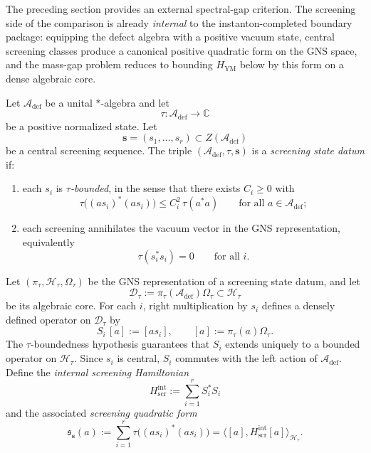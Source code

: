 The preceding section provides an external spectral-gap criterion.
The screening side of the comparison is already \emph{internal} to the
instanton-completed boundary package: equipping the defect algebra
with a positive vacuum state, central screening classes produce a
canonical positive quadratic form on the GNS space, and the mass-gap
problem reduces to bounding $H_{\mathrm{YM}}$ below by this form on a
dense algebraic core.

\begin{definition}
\label{def:screening-state-datum}
Let $\mathcal A_{\mathrm{def}}$ be a unital $*$-algebra and let
\[
\tau\colon \mathcal A_{\mathrm{def}}\longrightarrow \mathbb C
\]
be a positive normalized state. Let
\[
\mathbf s=(s_1,\dots,s_r)\subset Z(\mathcal A_{\mathrm{def}})
\]
be a central screening sequence.
The triple $(\mathcal A_{\mathrm{def}},\tau,\mathbf s)$ is a \emph{screening state datum} if:
\begin{enumerate}[label=(\roman*)]
\item each $s_i$ is \emph{$\tau$-bounded}, in the sense that there exists $C_i\ge 0$ with
\[
\tau\bigl((a s_i)^*(a s_i)\bigr)\le C_i^2\,\tau(a^*a)
\qquad\text{for all }a\in \mathcal A_{\mathrm{def}};
\]
\item each screening annihilates the vacuum vector in the GNS representation, equivalently
\[
\tau(s_i^*s_i)=0
\qquad\text{for all }i.
\]
\end{enumerate}
\end{definition}

\begin{construction}
\label{constr:internal-screening-operators}
Let $(\pi_\tau,\mathcal H_\tau,\Omega_\tau)$ be the GNS representation of a screening state datum,
and let
\[
\mathcal D_\tau:=\pi_\tau(\mathcal A_{\mathrm{def}})\Omega_\tau\subset \mathcal H_\tau
\]
be its algebraic core.
For each $i$, right multiplication by $s_i$ defines a densely defined operator on $\mathcal D_\tau$ by
\[
S_i\,[a]:=[a s_i],
\qquad [a]:=\pi_\tau(a)\Omega_\tau.
\]
The $\tau$-boundedness hypothesis guarantees that $S_i$ extends uniquely to a bounded operator on $\mathcal H_\tau$.
Since $s_i$ is central, $S_i$ commutes with the left action of $\mathcal A_{\mathrm{def}}$.
Define the \emph{internal screening Hamiltonian}
\[
H_{\mathrm{scr}}^{\mathrm{int}}:=\sum_{i=1}^r S_i^*S_i
\]
and the associated \emph{screening quadratic form}
\[
\mathfrak s_{\mathbf s}(a):=\sum_{i=1}^r \tau\bigl((a s_i)^*(a s_i)\bigr)
=\bigl\langle [a],H_{\mathrm{scr}}^{\mathrm{int}}[a]\bigr\rangle_{\mathcal H_\tau}.
\]
\end{construction}

